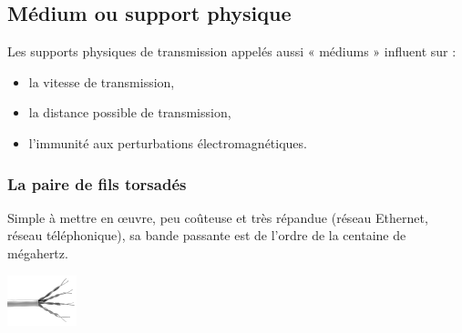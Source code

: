 \documentclass[10pt]{article}
\begin{document}
\subsection{Médium ou support physique}
Les supports physiques de transmission appelés aussi « médiums » influent sur :
\begin{itemize}
\item la vitesse de transmission,
\item la distance possible de transmission,
\item l'immunité aux perturbations électromagnétiques.
\end{itemize}

\subsubsection*{La paire de fils torsadés}
\begin{minipage}[c]{.78\linewidth}
Simple à mettre en œuvre, peu coûteuse et très répandue (réseau Ethernet, réseau téléphonique), sa bande passante est de l’ordre de la centaine de mégahertz.
\end{minipage} \hfill
\begin{minipage}[c]{.2\linewidth}
\begin{center}
\includegraphics[width=.95\textwidth]{images/fig_08}
\end{center}
\end{minipage} 
\end{document}
